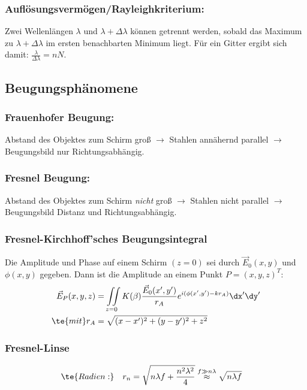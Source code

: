 \documentclass[twocolumn, unnumberedsubsub]{summery_3.1}
\begin{document}
\subsubsection{Auflösungsvermögen/Rayleighkriterium:}
Zwei Wellenlängen \(\lambda\) und \(\lambda + \Delta \lambda\) können getrennt werden, sobald das Maximum 
zu \(\lambda + \Delta \lambda\) im ersten benachbarten Minimum liegt.
Für ein Gitter ergibt sich damit: \(\frac{\lambda}{\Delta \lambda} = n N\).

\subsection{Beugungsphänomene}
\subsubsection*{Frauenhofer Beugung:}
Abstand des Objektes zum Schirm  gro{\ss} \(\to\) Stahlen annähernd parallel
\(\to\) Beugungsbild nur Richtungsabhängig.

\subsubsection{Fresnel Beugung:}
Abstand des Objektes zum Schirm \emph{nicht} gro{\ss} \(\to\) 
Stahlen nicht parallel \(\to\) Beugungsbild Distanz und Richtungsabhängig.

\subsubsection{Fresnel-Kirchhoff'sches Beugungsintegral}
Die Amplitude und Phase auf einem Schirm \((z=0)\) sei durch \(\vec E_0(x,y)\) 
und \(\phi(x,y)\) gegeben. Dann ist die Amplitude an einem
Punkt $P=(x,y,z)^T$:
\begin{align*}
    \vec E_P(x,y,z) &= \iint\limits_{z=0} K(\beta)\frac{\vec E_0(x',y')}{r_A} 
    e^{i(\phi(x',y') - k r_A)} \dx'\dy'\\
    \te{mit } r_A &= \sqrt{(x-x')^2 + (y-y')^2 + z^2}
\end{align*}

\subsubsection{Fresnel-Linse}\tight
\begin{align*}
        &\te{Radien:}  & r_n &= 
        \sqrt{n\lambda f + \frac{n^2\lambda^2}4} \overset{f\gg n\lambda}{\approx} \sqrt{n\lambda f}
\end{align*}
\end{document}
